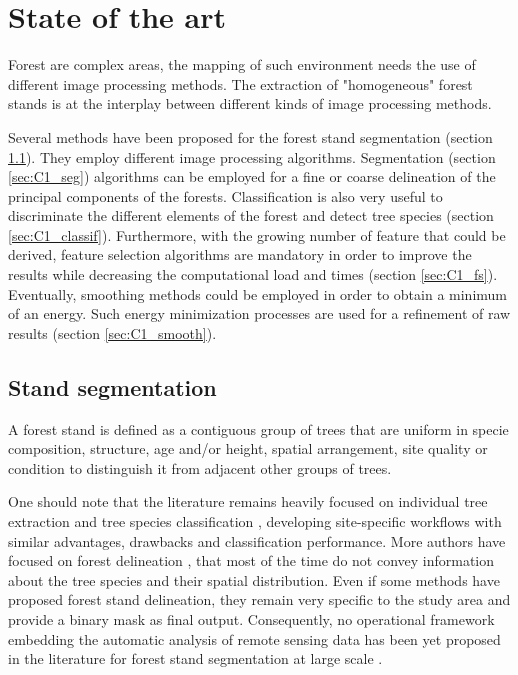 \chapter{State of the art} %
\label{Chapter1} %

\startcontents[chapters]
\Mprintcontents





Forest are complex areas, the mapping of such environment needs the use of different image processing methods. The extraction of "homogeneous" forest stands is at the interplay between different kinds of image processing methods.

Several methods have been proposed for the forest stand segmentation (section \ref{sec:C1_stand}). They employ different image processing algorithms. Segmentation (section \ref{sec:C1_seg}) algorithms can be employed for a fine or coarse delineation of the principal components of the forests. Classification is also very useful to discriminate the different elements of the forest and detect tree species (section \ref{sec:C1_classif}). Furthermore, with the growing number of feature that could be derived, feature selection algorithms are mandatory in order to improve the results while decreasing the computational load and times (section \ref{sec:C1_fs}). Eventually, smoothing methods could be employed in order to obtain a minimum of an energy. Such energy minimization processes are used for a refinement of raw results (section \ref{sec:C1_smooth}).

\section{Stand segmentation}
\label{sec:C1_stand}
A forest stand is defined as a contiguous group of trees that are uniform in specie composition, structure, age and/or height, spatial arrangement, site quality or condition to distinguish it from adjacent other groups of trees.

One should note that the literature remains heavily focused on individual tree extraction and tree species classification \citep{dalponte2014tree, vega2014ptrees, kandare2014new}, developing site-specific workflows with similar advantages, drawbacks and classification performance. More authors have focused on forest delineation \citep{eysn2012forest, wang2012forest, radoux2007quantitative}, that most of the time do not convey information about the tree species and their spatial distribution. Even if some methods have proposed forest stand delineation, they remain very specific to the study area and provide a binary mask as final output. Consequently, no operational framework embedding the automatic analysis of remote sensing data has been yet proposed in the literature for forest stand segmentation at large scale \citep{clement_IJPRS}. \\

